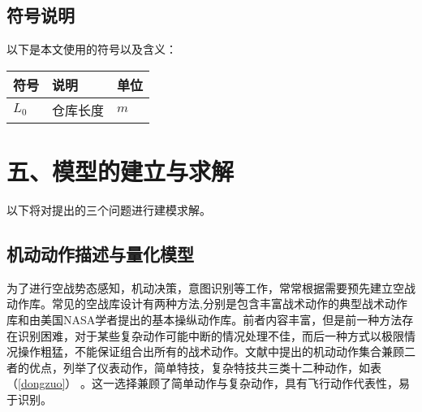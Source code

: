 \documentclass{my_paper}
\begin{document}
\subsection{符号说明}
以下是本文使用的符号以及含义：
\begin{table}[h]%
    \centering
    \begin{tabular}{p{2.0cm}<{\centering}p{9.0cm}<{\centering}p{2.0cm}<{\centering}}
    \hline
    符号 & 说明 & 单位 \\ %
    \hline
    $L_0$ & 仓库长度 &  $m$\\
    
    \hline
    \end{tabular}
\end{table}

\section{五、模型的建立与求解}

以下将对提出的三个问题进行建模求解。

\subsection{机动动作描述与量化模型}

为了进行空战势态感知，机动决策，意图识别等工作，常常根据需要预先建立空战动作库\cite{1}。常见的空战库设计有两种方法,分别是包含丰富战术动作的典型战术动作库和由美国NASA学者\cite{2}提出的基本操纵动作库。前者内容丰富，但是前一种方法存在识别困难，对于某些复杂动作可能中断的情况处理不佳，而后一种方式以极限情况操作粗猛，不能保证组合出所有的战术动作。文献\cite{3}中提出的机动动作集合兼顾二者的优点，列举了仪表动作，简单特技，复杂特技共三类十二种动作，如表（\ref{dongzuo}） 。这一选择兼顾了简单动作与复杂动作，具有飞行动作代表性，易于识别。

\begin{table}[h]
\centering
\vspace{3pt}
\centering
  \setlength{\leftskip}{0pt plus 1fil minus \marginparwidth}%
  \setlength{\rightskip}{\leftskip}
\caption{{caption:default}}
\end{table}
\end{document}
